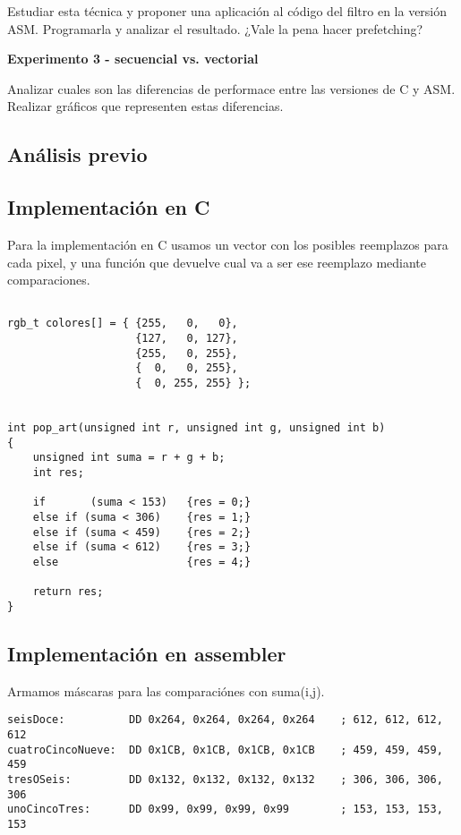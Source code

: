   \vspace*{0.2cm}
  Estudiar esta técnica y proponer una aplicación al código del filtro en la versión ASM.
  Programarla y analizar el resultado. ¿Vale la pena hacer prefetching?

\vspace*{0.3cm} \noindent
\textbf{Experimento 3 - secuencial vs. vectorial}

  Analizar cuales son las diferencias de performace entre las versiones de C y ASM. 
  Realizar gráficos que representen estas diferencias.


\subsection{An\'alisis previo}

\subsection{Implementaci\'on en C}
Para la implementaci\'on en C usamos un vector con los posibles reemplazos para cada pixel, y una funci\'on que devuelve cual va a ser ese reemplazo mediante comparaciones.
\begin{codesnippet}
\begin{verbatim}

rgb_t colores[] = { {255,   0,   0},
                    {127,   0, 127},
                    {255,   0, 255},
                    {  0,   0, 255},
                    {  0, 255, 255} };

			
int pop_art(unsigned int r, unsigned int g, unsigned int b)
{
	unsigned int suma = r + g + b;
	int res;
	
	if 		 (suma < 153)	{res = 0;}
	else if (suma < 306)	{res = 1;}
	else if (suma < 459)	{res = 2;}
	else if (suma < 612)	{res = 3;}
	else 					{res = 4;}
	
	return res;
}
\end{verbatim}
\end{codesnippet}

\subsection{Implementaci\'on en assembler}
Armamos máscaras para las comparaci\'ones con suma(i,j).
\begin{codesnippet}
\begin{verbatim}
seisDoce:          DD 0x264, 0x264, 0x264, 0x264    ; 612, 612, 612, 612			
cuatroCincoNueve:  DD 0x1CB, 0x1CB, 0x1CB, 0x1CB    ; 459, 459, 459, 459	
tresOSeis:         DD 0x132, 0x132, 0x132, 0x132    ; 306, 306, 306, 306	
unoCincoTres:      DD 0x99, 0x99, 0x99, 0x99        ; 153, 153, 153, 153
\end{verbatim}
\end{codesnippet}

